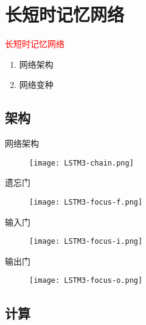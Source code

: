 \section{长短时记忆网络}
\label{sec:lstm}

\begin{frame}
  \begin{center}
    \Huge{\textcolor{red}{长短时记忆网络}}
  \end{center}

  \begin{enumerate}
    \item \alert{网络架构}
    \item \alert{网络变种}
  \end{enumerate}
\end{frame}

\subsection{架构}

\begin{frame}[fragile]{网络架构}
  \begin{figure}
    \centering
    \texttt{[image: LSTM3-chain.png]}
  \end{figure}
\end{frame}

\begin{frame}[fragile]{遗忘门}
  \begin{figure}
    \centering
    \texttt{[image: LSTM3-focus-f.png]}
  \end{figure}
\end{frame}

\begin{frame}[fragile]{输入门}
  \begin{figure}
    \centering
    \texttt{[image: LSTM3-focus-i.png]}
  \end{figure}
\end{frame}

\begin{frame}[fragile]{输出门}
  \begin{figure}
    \centering
    \texttt{[image: LSTM3-focus-o.png]}
  \end{figure}
\end{frame}

\subsection{计算}

